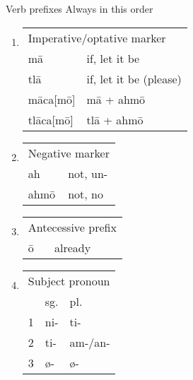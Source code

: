 \documentclass[12pt]{beamer}
\newcommand{\nah}[1]{\textcolor{nahgrn}{#1}}
\newcommand{\trs}[1]{\textcolor{nahblu}{#1}}
\begin{document}
\begin{frame}%
  \begin{columns}[t]
    \begin{column}{0.18\linewidth}
      \begin{block}{Verb prefixes}
        Always in this order
        \begin{enumerate}
        \item
          \begin{tabular}[t]{ll}
            \multicolumn{2}{l}{Imperative/optative marker}       \\
            \nah{mā} & \trs{if, let it be} \\
            \nah{tlā} & \trs{if, let it be (please)}\\
            \nah{māca[mō]} & \nah{mā + ahmō} \\
            \nah{tlāca[mō]} & \nah{tlā + ahmō} \\
          \end{tabular}
        \item
          \begin{tabular}[t]{ll}
            \multicolumn{2}{l}{Negative marker}\\
            \nah{ah} & \trs{not, un-}\\
            \nah{ahmō} & \trs{not, no} \\
          \end{tabular}
        \item 
          \begin{tabular}[t]{ll}
            \multicolumn{2}{l}{Antecessive prefix}\\
            \nah{ō} & \trs{already} \\
          \end{tabular}
        \item 
          \begin{threeparttable}
            \begin{tabular}[t]{lll}
              \multicolumn{3}{l}{Subject pronoun}\\
              & sg. & pl. \\
              1 & \nah{ni-} & \nah{ti-}\\
              2 & \nah{ti-}\tnote{1} & \nah{am-/an-}\tnote{1} \\
              3 & \nah{ø-} & \nah{ø-} \\
            \end{tabular}
            \begin{tablenotes}

\end{tablenotes}
\end{threeparttable}
\end{enumerate}
\end{block}
\end{column}
\end{columns}
\end{frame}
\end{document}
